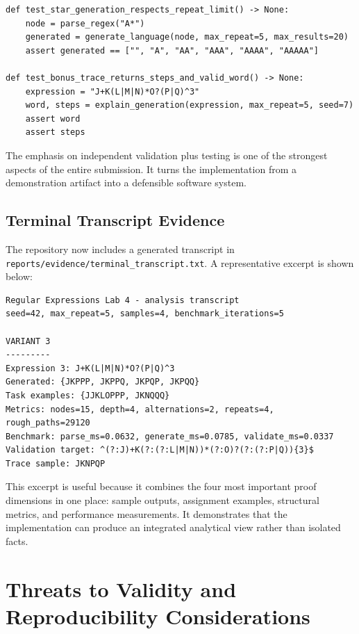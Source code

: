 \documentclass[a4paper,12pt]{article}
\begin{document}
\begin{lstlisting}[style=labpython,caption={Representative test excerpt.}]
def test_star_generation_respects_repeat_limit() -> None:
    node = parse_regex("A*")
    generated = generate_language(node, max_repeat=5, max_results=20)
    assert generated == ["", "A", "AA", "AAA", "AAAA", "AAAAA"]

def test_bonus_trace_returns_steps_and_valid_word() -> None:
    expression = "J+K(L|M|N)*O?(P|Q)^3"
    word, steps = explain_generation(expression, max_repeat=5, seed=7)
    assert word
    assert steps
\end{lstlisting}

The emphasis on independent validation plus testing is one of the strongest aspects of the entire submission. It turns the implementation from a demonstration artifact into a defensible software system.

\subsection{Terminal Transcript Evidence}

The repository now includes a generated transcript in \texttt{reports/evidence/terminal\_transcript.txt}. A representative excerpt is shown below:

\begin{lstlisting}[style=labterminal,caption={Excerpt from the generated evidence transcript.}]
Regular Expressions Lab 4 - analysis transcript
seed=42, max_repeat=5, samples=4, benchmark_iterations=5

VARIANT 3
---------
Expression 3: J+K(L|M|N)*O?(P|Q)^3
Generated: {JKPPP, JKPPQ, JKPQP, JKPQQ}
Task examples: {JJKLOPPP, JKNQQQ}
Metrics: nodes=15, depth=4, alternations=2, repeats=4, rough_paths=29120
Benchmark: parse_ms=0.0632, generate_ms=0.0785, validate_ms=0.0337
Validation target: ^(?:J)+K(?:(?:L|M|N))*(?:O)?(?:(?:P|Q)){3}$
Trace sample: JKNPQP
\end{lstlisting}

This excerpt is useful because it combines the four most important proof dimensions in one place: sample outputs, assignment examples, structural metrics, and performance measurements. It demonstrates that the implementation can produce an integrated analytical view rather than isolated facts.

\section{Threats to Validity and Reproducibility Considerations}
\end{document}

